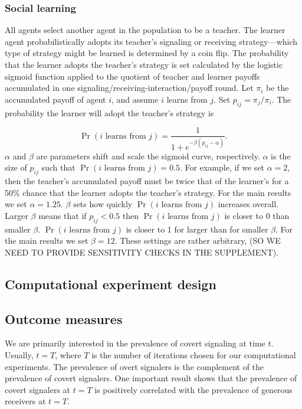 \documentclass[11pt,letterpaper]{article}
\begin{document}
\subsubsection{Social learning}

All agents select another agent in the population to be a teacher. The 
learner agent probabilistically adopts its teacher's signaling or receiving 
strategy---which type of strategy might be learned is determined by a coin flip. 
The probability that the learner adopts the teacher's strategy is set 
calculated by the logistic sigmoid function applied to the quotient of 
teacher and learner payoffs accumulated in one signaling/receiving-interaction/payoff round.
Let $\pi_{i}$ be the accumulated payoff of agent $i$, and assume $i$ learns
from $j$. Set $p_{ij} = \pi_{j} / \pi_i$. 
The probability the learner will adopt the teacher's strategy is

\begin{equation}
  \Pr(\text{$i$ learns from $j$}) = \frac{1}{1 + e^{-\beta(p_{ij} - \alpha)}}.
\end{equation}
\noindent
$\alpha$ and $\beta$ are parameters shift and scale the sigmoid curve, respectively. 
$\alpha$ is the size of $p_{ij}$ such that $\Pr(\text{$i$ learns from $j$}) = 0.5$. %
For example, if we set $\alpha = 2$, then the teacher's accumulated payoff
must be twice that of the learner's for a 50\% chance that the learner 
adopts the teacher's strategy. 
For the main results we set $\alpha=1.25$. $\beta$ sets how quickly 
$\Pr(\text{$i$ learns from $j$})$ increases overall. Larger $\beta$ means that
if $p_{ij} < 0.5$ then $\Pr(\text{$i$ learns from $j$})$ is closer to 0 than smaller $\beta$. 
$\Pr(\text{$i$ learns from $j$})$ is closer to 1 for larger than for smaller $\beta$. For the main
results we set $\beta = 12$. These settings are rather arbitrary, (SO WE NEED
TO PROVIDE SENSITIVITY CHECKS IN THE SUPPLEMENT).


\subsection{Computational experiment design}

\subsection{Outcome measures}

We are primarily interested in the prevalence of covert signaling at time
$t$. Usually, $t=T$, where $T$ is the number of iterations chosen for our 
computational experiments. The prevalence of overt signalers is the complement 
of the prevalence of covert signalers. One important result shows that the
prevalence of covert signalers at $t=T$ is positively correlated with the
prevalence of generous receivers at $t=T$.  
\end{document}
